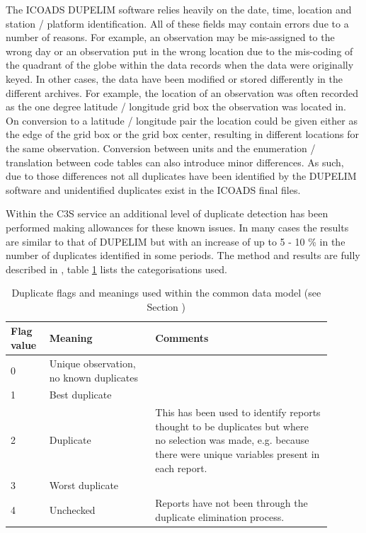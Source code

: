 The ICOADS DUPELIM software relies heavily on the date, time, location and station / platform identification. 
All of these fields may contain errors due to a number of reasons. 
For example, an observation may be mis-assigned to the wrong day or an observation put in the wrong location due to the mis-coding of the quadrant of the globe within the data records when the data were originally keyed. 
In other cases, the data have been modified or stored differently in the different archives.
For example, the location of an observation was often recorded as the one degree latitude / longitude grid box the observation was located in.
On conversion to a latitude / longitude pair the location could be given either as the edge of the grid box or the grid box center, resulting in different locations for the same observation.
Conversion between units and the enumeration / translation between code tables can also introduce minor differences.
As such, due to those differences not all duplicates have been identified by the DUPELIM software and unidentified duplicates exist in the ICOADS final files.

Within the C3S service an additional level of duplicate detection has been performed making allowances for these known issues.
In many cases the results are similar to that of DUPELIM but with an increase of up to 5 - 10 \% in the number of duplicates identified in some periods.
The method and results are fully described in \cite{Kent2019dup}, table \ref{tab:dup_flags} lists the categorisations used.

\begin{table}
\centering
\caption{Duplicate flags and meanings used within the common data model (see Section )}
\label{tab:dup_flags}
\begin{tabular}{|p{0.1\linewidth}|p{0.3\linewidth}|p{0.5\linewidth}|}
\hline
\bfseries Flag value & \bfseries Meaning & \bfseries Comments \\
\hline
0 & Unique observation, no known duplicates & \\\hline
1 & Best duplicate & \\\hline
2 & Duplicate & This has been used to identify reports thought to be duplicates but where no selection was made, e.g. because there were unique variables present in each report. \\\hline
3 & Worst duplicate & \\\hline
4 & Unchecked & Reports have not been through the duplicate elimination process.\\\hline
\end{tabular}
\end{table}


